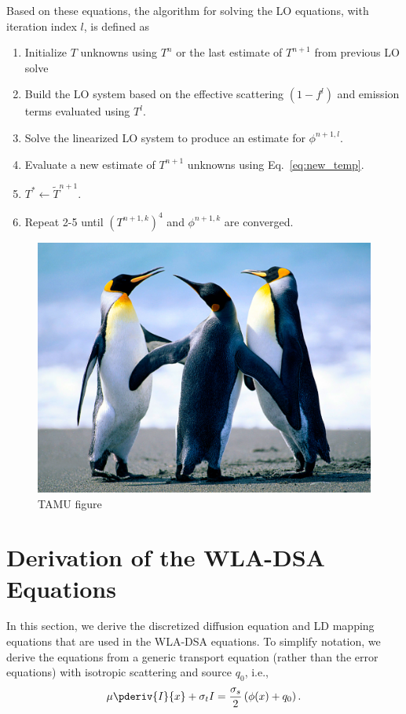 Based on these equations, the algorithm for solving the LO equations, with iteration index
$l$, is defined as
\begin{enumerate}
    \item Initialize $T$ unknowns using $T^n$ or the last estimate of $T^{n+1}$ from
        previous LO solve
    \item  Build the LO system based on the effective scattering $(1-f^l)$ and emission terms
          evaluated using $T^l$.
    \item Solve the linearized LO system to produce an estimate for $\phi^{n+1,l}$.
    \item Evaluate a new estimate of $T^{n+1}$ unknowns using Eq.~\eqref{eq:new_temp}.
    \item $T^*\leftarrow\tilde{T}^{n+1}$.
    \item Repeat 2-5 until $(T^{n+1,k})^4$ and $\phi^{n+1,k}$ are converged.
\end{enumerate}

\begin{figure}[H]
\centering
\includegraphics[scale=.50]{figures/Penguins.jpg}
\caption{TAMU figure}
\label{fig:tamu-fig5}
\end{figure}

\section{Derivation of the WLA-DSA Equations}
\label{sec:wla_derivation}

In this section, we derive the discretized diffusion equation and LD mapping equations
that are used in the WLA-DSA equations.  To simplify notation, we
derive the equations from a generic transport equation (rather than the error equations) with isotropic scattering
and source $q_0$, i.e.,
\begin{equation}\label{eq:ss_trans}
    \mu \pderiv{I}{x} + \sigma_t I = \frac{\sigma_s}{2}\left( \phi(x) + q_0\right).
\end{equation}

